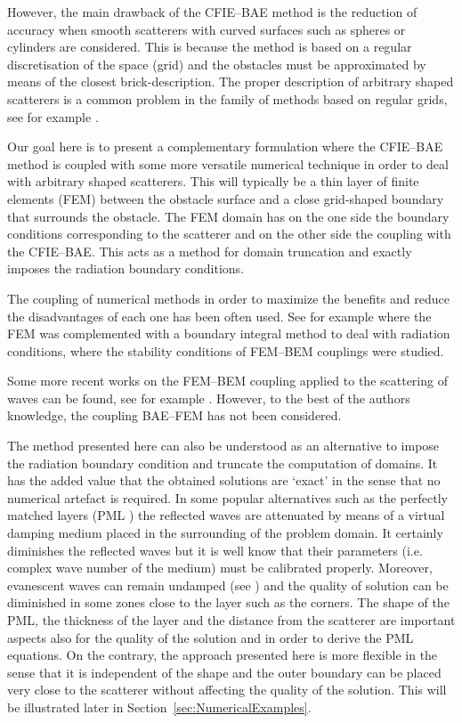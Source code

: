 \documentclass[12pt]{article}
\newcommand{\sref}[1]{Section~\ref{#1}}
\begin{document}
However, the main drawback of the CFIE--BAE method is the reduction of accuracy when smooth scatterers with curved surfaces such as spheres or cylinders are considered. This is because the method is based on a regular discretisation of the space (grid) and the obstacles must be approximated by means of the closest brick-description. The proper description of arbitrary shaped scatterers is a common problem in the family of methods based on regular grids, see for example \cite{medvinsky-MTT:2013}.

Our goal here is to present a complementary formulation where the CFIE--BAE method is coupled with some more versatile numerical technique in order to deal with arbitrary shaped scatterers. This will typically be a thin layer of finite elements (FEM) between the obstacle surface and a close grid-shaped boundary that surrounds the obstacle. The FEM domain has on the one side the boundary conditions corresponding to the scatterer and on the other side the coupling with the CFIE--BAE. This acts as a method for domain truncation and exactly imposes the radiation boundary conditions.

The coupling of numerical methods in order to maximize the benefits and reduce the disadvantages of each one has been often used. See for example \cite{Zienkiewicz-ZKB:1977} where the FEM was complemented with a boundary integral method to deal with radiation conditions, \cite{JohnsonNedelec:1980} where the stability conditions of FEM--BEM couplings were studied.


Some more recent works on the FEM--BEM coupling applied to the scattering of waves can be found, see for example \cite{hsiao:1991, Chiang:2000, Gatica:2009}. However, to the best of the authors knowledge, the coupling BAE--FEM has not been considered.

The method presented here can also be understood as an alternative to impose the radiation boundary condition and truncate the computation of domains. It has the added value that the obtained solutions are `exact' in the sense that no numerical artefact is required. In some popular alternatives such as the perfectly matched layers (PML \cite{Berenger:1994}) the reflected waves are attenuated by means of a virtual damping medium placed in the surrounding of the problem domain. It certainly diminishes the reflected waves but it is well know that their parameters (i.e. complex wave number of the medium) must be calibrated properly. Moreover, evanescent waves can remain undamped (see \cite{zampolli:2008,basu:2003}) and the quality of solution can be diminished in some zones close to the layer such as the corners. The shape of the PML, the thickness of the layer and the distance from the scatterer are important aspects also for the quality of the solution and in order to derive the PML equations. On the contrary, the approach presented here is more flexible in the sense that it is independent of the shape and the outer boundary can be placed very close to the scatterer without affecting the quality of the solution. This will be illustrated later in \sref{sec:NumericalExamples}.
\end{document}
